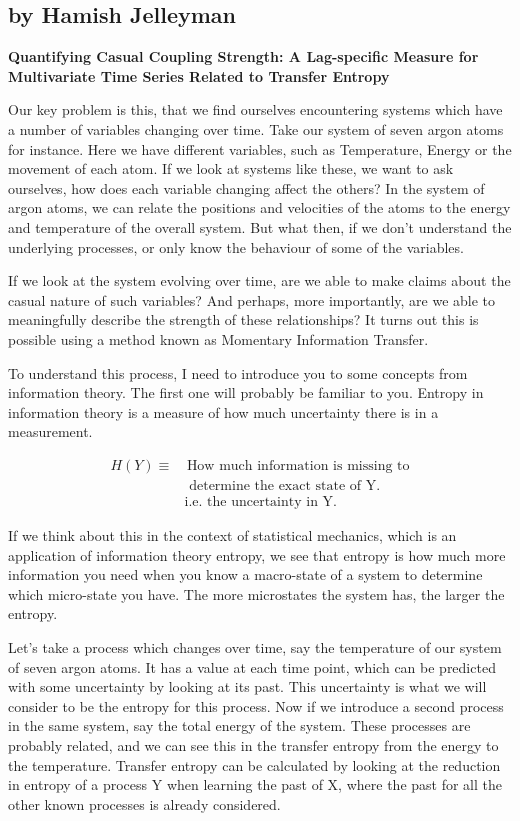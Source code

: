 \subsection{by Hamish Jelleyman}
\textbf{Quantifying Casual Coupling Strength: A Lag-specific Measure for Multivariate Time Series Related to Transfer Entropy}

Our key problem is this, that we find ourselves encountering systems which have a number of variables changing over time. Take our system of seven argon atoms for instance. Here we have different variables, such as Temperature, Energy or the movement of each atom. If we look at systems like these, we want to ask ourselves, how does each variable changing affect the others? In the system of argon atoms, we can relate the positions and velocities of the atoms to the energy and temperature of the overall system. But what then, if we don’t understand the underlying processes, or only know the behaviour of some of the variables. \medskip

If we look at the system evolving over time, are we able to make claims about the casual nature of such variables? And perhaps, more importantly, are we able to meaningfully describe the strength of these relationships? It turns out this is possible using a method known as Momentary Information Transfer.\medskip

To understand this process, I need to introduce you to some concepts from information theory. The first one will probably be familiar to you. Entropy in information theory is a measure of how much uncertainty there is in a measurement. 

\begin{align*}
H(Y)\equiv&\,
\text{How much information is missing to}\\
&\text{ determine the exact state of Y.}\\
&\text{i.e. the uncertainty in Y.}
\end{align*}

If we think about this in the context of statistical mechanics, which is an application of information theory entropy, we see that entropy is how much more information you need when you know a macro-state of a system to determine which micro-state you have. The more microstates the system has, the larger the entropy.\medskip

Let’s take a process which changes over time, say the temperature of our system of seven argon atoms. It has a value at each time point, which can be predicted with some uncertainty by looking at its past. This uncertainty is what we will consider to be the entropy for this process. Now if we introduce a second process in the same system, say the total energy of the system. These processes are probably related, and we can see this in the transfer entropy from the energy to the temperature. Transfer entropy can be calculated by looking at the reduction in entropy of a process Y when learning the past of X, where the past for all the other known processes is already considered.


